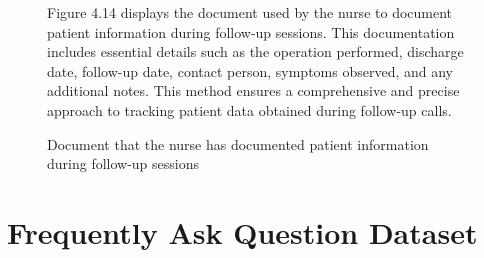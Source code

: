 \documentclass[12pt,oneside,openright,a4paper]{cpe-english-project}
\begin{document}
      \begin{figure}
        \centering
        \caption{Document that the nurse has documented patient information during follow-up sessions}\label{fig:Interview_4}
        \begin{flushleft}
          \qquad Figure 4.14 displays the document used by the nurse to document patient information during follow-up sessions. This documentation includes essential details such as the operation performed, discharge date, follow-up date, contact person, symptoms observed, and any additional notes. This method ensures a comprehensive and precise approach to tracking patient data obtained during follow-up calls. \par
        \end{flushleft}
      \end{figure}
    
  \FloatBarrier{}    
  \section{Frequently Ask Question Dataset}
\end{document}
